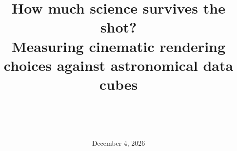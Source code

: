 \documentclass[11pt,letterpaper]{article}
\title{How much science survives the shot?\\
\large Measuring cinematic rendering choices against astronomical data cubes}
\author{\myname\\[2pt] \small \myuin\\ \small \mycourse\\ \small \myinstructor}
\date{December 4, 2026}
\begin{document}
\maketitle

\begin{abstract}

\end{abstract}











\end{document}
